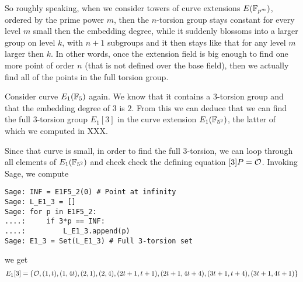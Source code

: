 So roughly speaking, when we consider towers of curve extensions $E(\mathbb{F}_{p^m})$, ordered by the prime power $m$, then the $n$-torsion group stays constant for every level $m$ small then the embedding degree, while it suddenly blossoms into a larger group on level $k$, with $n+1$ subgroups and it then stays like that for any level $m$ larger then $k$. In other words, once the extension field is big enough to find one more point of order $n$ (that is not defined over the base field), then we actually find all of the points in the full torsion group.
\begin{example} Consider curve $E_1(\mathbb{F}_5)$ again. We know that it contains a $3$-torsion group and that the embedding degree of $3$ is $2$. From this we can deduce that we can find the full $3$-torsion group $E_1[3]$ in the curve extension $E_1(\mathbb{F}_{5^2})$, the latter of which we computed in XXX. 

Since that curve is small, in order to find the full $3$-torsion, we can loop through all elements of $E_1(\mathbb{F}_{5^2})$ and check check the defining equation $[3]P= \mathcal{O}$. Invoking Sage, we compute
\begin{verbatim}
Sage: INF = E1F5_2(0) # Point at infinity
Sage: L_E1_3 = []
Sage: for p in E1F5_2:
....:     if 3*p == INF:
....:         L_E1_3.append(p)
Sage: E1_3 = Set(L_E1_3) # Full 3-torsion set
\end{verbatim}
we get
$$
E_1[3] = \{\mathcal{O},(1,t),(1,4t),(2,1),(2,4), (2t + 1,t + 1),
 (2t + 1, 4t + 4), (3t + 1,t + 4), (3t + 1, 4t + 1) \}
$$
\end{example}
